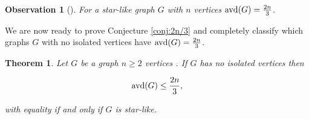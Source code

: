 \documentclass[11pt]{article}
\newtheorem{theorem}[definition]{Theorem}
\newtheorem{observation}[definition]{Observation}
\newcommand{\avd}{\text{\rm{avd}}}
\begin{document}
\begin{observation}[\cite{2021Beaton}]
\label{obs:StarLike}
For a star-like graph $G$ with $n$ vertices $ \avd(G) = \frac{2n}{3}$.
\end{observation}


 We are now ready to prove Conjecture \ref{conj:2n/3} and completely classify which graphs $G$ with no isolated vertices have $\avd(G) = \frac{2n}{3}$. 

\begin{theorem}
\label{thm:2n/3}
Let $G$ be a graph $n \geq 2$ vertices . If $G$ has no isolated vertices then 

$$\avd(G) \leq \frac{2n}{3}, $$

\noindent with equality if and only if $G$ is star-like. 
\end{theorem}
\end{document}
